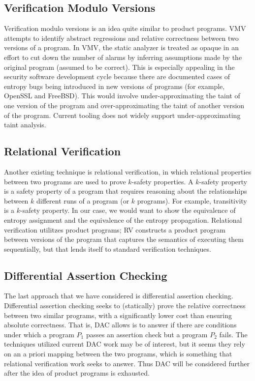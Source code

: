 \documentclass[letterpaper,twocolumn,10pt]{article}
\begin{document}
\subsection{Verification Modulo Versions}
Verification modulo versions is an idea quite similar to product programs. VMV attempts to identify abstract regressions and relative correctness between two versions of a program.
In VMV, the static analyzer is treated as opaque in an effort to cut down the number of alarms by inferring assumptions made by the original program (assumed to be correct). This is especially appealing in the security software development cycle because there are documented cases of entropy bugs being introduced in new versions of programs (for example, OpenSSL and FreeBSD). This would involve under-approximating the taint of one version of the program and over-approximating the taint of another version of the program. Current tooling does not widely support under-approximating taint analysis. 


\subsection{Relational Verification}
Another existing technique is relational verification, in which relational properties between two programs are used to prove $k$-safety properties. A $k$-safety property is a safety property of a program that requires 
reasoning about the relationships between $k$ different runs of a program (or $k$ programs). For example, transitivity is a $k$-safety property.
In our case, we would want to show the equivalence of entropy assignment and the equivalence of the entropy propagation. Relational verification utilitzes product programs; RV constructs a product program between versions of the program that captures the semantics of executing them sequentially, but that lends itself to standard verification techniques. 

\subsection{Differential Assertion Checking}

The last approach that we have considered is differential assertion checking. Differential assertion checking seeks to (statically) prove the relative correctness between two similar programs,
with a significantly lower cost than ensuring absolute correctness. That is, DAC allows is to answer if there are conditions under which a program $P_1$ passes an assertion check but
a program $P_2$ fails. The techniques utilized current DAC work may be of interest, but it seems they rely on an a priori mapping between the two programs, which is something that
relational verification work seeks to answer. Thus DAC will be considered further after the idea of product programs is exhausted.
\end{document}
